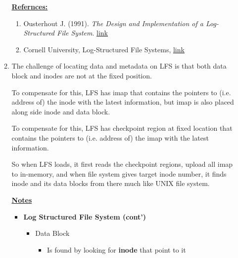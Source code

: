 \documentclass[12pt]{article}
\begin{document}
\begin{enumerate}[1.]
\begin{enumerate}[1)]
        \bigskip

        \underline{\textbf{Refernces:}}

        \bigskip

        \begin{enumerate}[1)]
            \item Ousterhout J. (1991). \textit{The Design and Implementation of a Log-Structured File System}. \href{https://people.eecs.berkeley.edu/~brewer/cs262/LFS.pdf}{link}
            \item Cornell University, Log-Structured File Systems, \href{http://www.cs.cornell.edu/courses/cs4410/2015su/lectures/lec20-lfs.html#:~:text=The%20downside%20of%20storing%20the,or%20inode)%20in%20the%20segment.}{link}
        \end{enumerate}

        \item

        \bigskip

        The challenge of locating data and metadata on LFS is that both data block and inodes are
        not at the fixed position.

        \bigskip

        To compensate for this, LFS has imap that contains the pointers to (i.e. address of)
        the inode with the latest information, but imap is also placed along side inode
        and data block.

        \bigskip

        To compensate for this, LFS has checkpoint region at fixed location that contains the pointers to (i.e. address of)
        the imap with the latest information.

        \bigskip

        So when LFS loads, it first reads the checkpoint regions, upload all imap to in-memory, and when file system gives target inode number, it
        finds inode and its data blocks from there much like UNIX file system.

        \bigskip

        \underline{\textbf{Notes}}

        \begin{itemize}
            \item \textbf{Log Structured File System (cont')}
            \begin{itemize}
                \item Data Block
                \begin{itemize}
                    \item Is found by looking for \textbf{inode} that point to it
                \end{itemize}


\end{itemize}
\end{itemize}
\end{enumerate}
\end{enumerate}
\end{document}
